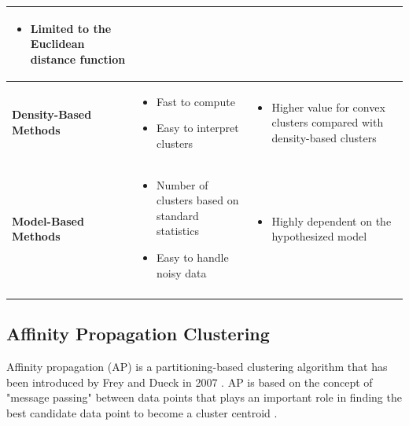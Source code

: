 \documentclass[../UNBThesis2.tex]{subfiles}
\begin{document}
\begin{table}[!h]
\begin{tabularx}{\linewidth}{p{3cm} p{5.5cm} p{5.5cm}}
\begin{itemize}[*,nosep,leftmargin=0.2cm]
    \item Limited to the Euclidean distance function
\end{itemize}
\tabularnewline \hline
\vfill
 \textbf{Density-Based Methods}
& 
\begin{itemize}[*,nosep,leftmargin=0.2cm]
    \item Fast to compute
    \item Easy to interpret clusters %
\end{itemize}
 &       
\begin{itemize}[*,nosep,leftmargin=0.2cm]
    \item Higher value for convex clusters compared with density-based clusters
\end{itemize}
\tabularnewline \hline
\vfill
 \textbf{Model-Based Methods}
& 
\begin{itemize}[*,nosep,leftmargin=0.2cm]
    \item Number of clusters based on standard statistics 
    \item Easy to handle noisy data            
\end{itemize}
 &       
\begin{itemize}[*,nosep,leftmargin=0.2cm]
    \item Highly dependent on the hypothesized model
\end{itemize} 
\tabularnewline \hline
\vfill
\end{tabularx}
\end{table}







\subsection{Affinity Propagation Clustering}

Affinity propagation (AP) is a partitioning-based clustering algorithm that has been introduced by Frey and Dueck in 2007 \cite{frey2006mixture}. AP is based on the concept of "message passing" between data points that plays an important role in finding the best candidate data point to become a cluster centroid \cite{jiang2019exemplar, frey2007clustering}. 
\end{document}
